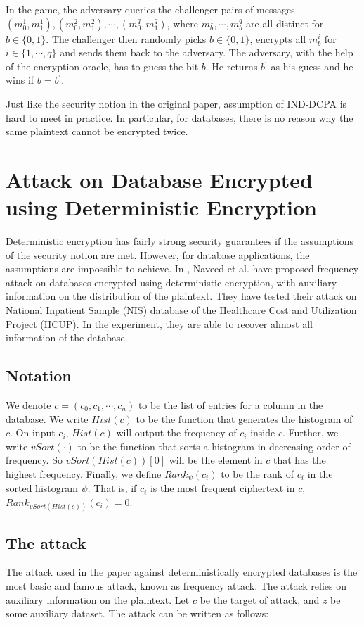 \documentclass[10pt]{book}
\begin{document}
In the game, the adversary queries the challenger pairs of messages $(m_0^{1}, m_1^{1}), (m_0^{2}, m_1^{2}), \cdots, (m_0^{q}, m_1^{q})$, where $m_b^{1}, \cdots, m_b^{q}$ are all distinct for $b \in \{0, 1\}$. The challenger then randomly picks $b \in \{0, 1\}$, encrypts all $m_b^{i}$ for $i \in \{1, \cdots, q\}$ and sends them back to the adversary. The adversary, with the help of the encryption oracle, has to guess the bit $b$. He returns $b^{'}$ as his guess and he wins if $b = b^{'}$.

Just like the security notion in the original paper, assumption of IND-DCPA is hard to meet in practice. In particular, for databases, there is no reason why the same plaintext cannot be encrypted twice.




\section{Attack on Database Encrypted using Deterministic Encryption}
Deterministic encryption has fairly strong security guarantees if the assumptions of the security notion are met. However, for database applications, the assumptions are impossible to achieve. In \cite{Naveed:2015:IAP:2810103.2813651}, Naveed et al. have proposed frequency attack on databases encrypted using deterministic encryption, with auxiliary information on the distribution of the plaintext. They have tested their attack on National Inpatient Sample (NIS) database of the Healthcare Cost and Utilization Project (HCUP). In the experiment, they are able to recover almost all information of the database.

\subsection{Notation}
We denote $c = (c_0, c_1, \cdots, c_n)$ to be the list of entries for a column in the database. We write $Hist(c)$ to be the function that generates the histogram of $c$. On input $c_i$, $Hist(c)$ will output the frequency of $c_i$ inside $c$. Further, we write $vSort(\cdot)$ to be the function that sorts a histogram in decreasing order of frequency. So $vSort(Hist(c))[0]$ will be the element in $c$ that has the highest frequency. Finally, we define $Rank_{\psi}(c_i)$ to be the rank of $c_i$ in the sorted histogram $\psi$. That is, if $c_i$ is the most frequent ciphertext in $c$, $Rank_{vSort(Hist(c))}(c_i) = 0$.


\subsection{The attack}
The attack used in the paper against deterministically encrypted databases is the most basic and famous attack, known as frequency attack. The attack relies on auxiliary information on the plaintext. Let $c$ be the target of attack, and $z$ be some auxiliary dataset. The attack can be written as follows:
\end{document}
